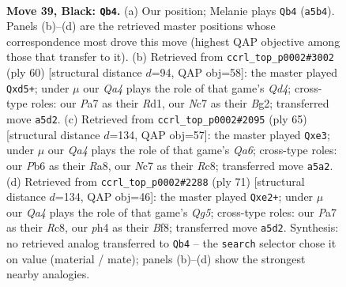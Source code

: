 \documentclass[11pt]{article}
\begin{document}
\clearpage

\begin{figure}[p]\centering
\begin{subfigure}{0.46\textwidth}\centering
\resizebox{\linewidth}{!}{%
\newchessgame
\chessboard[
  setfen={1rb2r2/p1n2p1k/1pB2Bp1/qN1p4/7P/1P4p1/R1PNQP2/R5K1 b - - 1 39},
  showmover=false,
  pgfstyle=straightmove, color=movearrow, markmove={a5-b4}
]}
\caption{}
\end{subfigure}\hfill
\begin{subfigure}{0.46\textwidth}\centering
\resizebox{\linewidth}{!}{%
\newchessgame
\chessboard[
  setfen={1r2r1k1/6p1/p1q2p1p/3b4/PPpQn3/4P1P1/R4PBP/3R2K1 w - - 0 31},
  showmover=false,
  pgfstyle=straightmove, color=movearrow, markmove={d4-d5}
]}
\caption{}
\end{subfigure}
\\[4pt]
\begin{subfigure}{0.46\textwidth}\centering
\resizebox{\linewidth}{!}{%
\newchessgame
\chessboard[
  setfen={r1r3k1/5p2/p3N1pp/1p2P2n/5P1Q/q3B2P/6K1/1BRR4 b - - 0 33},
  showmover=false,
  pgfstyle=straightmove, color=movearrow, markmove={a3-e3}
]}
\caption{}
\end{subfigure}\hfill
\begin{subfigure}{0.46\textwidth}\centering
\resizebox{\linewidth}{!}{%
\newchessgame
\chessboard[
  setfen={2r2b2/p6k/1pnp3r/4p3/2P1PpqN/PP1R4/4QBP1/3R1K2 b - - 17 36},
  showmover=false,
  pgfstyle=straightmove, color=movearrow, markmove={g4-e2}
]}
\caption{}
\end{subfigure}
\caption{\textbf{Move 39, Black: \texttt{Qb4}.} (a) Our position; Melanie plays \texttt{Qb4} (\texttt{a5b4}). Panels (b)--(d) are the retrieved master positions whose correspondence most drove this move (highest QAP objective among those that transfer to it). (b) Retrieved from \texttt{ccrl\_top\_p0002\#3002} (ply 60) [structural distance $d$=94, QAP obj=58]: the master played \texttt{Qxd5+}; under $\mu$ our \emph{Qa4} plays the role of that game's \emph{Qd4}; cross-type roles: our \emph{P}a7 as their \emph{R}d1, our \emph{N}c7 as their \emph{B}g2; transferred move \texttt{a5d2}. (c) Retrieved from \texttt{ccrl\_top\_p0002\#2095} (ply 65) [structural distance $d$=134, QAP obj=57]: the master played \texttt{Qxe3}; under $\mu$ our \emph{Qa4} plays the role of that game's \emph{Qa6}; cross-type roles: our \emph{P}b6 as their \emph{R}a8, our \emph{N}c7 as their \emph{R}c8; transferred move \texttt{a5a2}. (d) Retrieved from \texttt{ccrl\_top\_p0002\#2288} (ply 71) [structural distance $d$=134, QAP obj=46]: the master played \texttt{Qxe2+}; under $\mu$ our \emph{Qa4} plays the role of that game's \emph{Qg5}; cross-type roles: our \emph{P}a7 as their \emph{R}c8, our \emph{p}h4 as their \emph{B}f8; transferred move \texttt{a5d2}. Synthesis: no retrieved analog transferred to \texttt{Qb4} -- the \texttt{search} selector chose it on value (material / mate); panels (b)--(d) show the strongest nearby analogies.}
\label{fig:thought-m77}
\end{figure}
\end{document}
